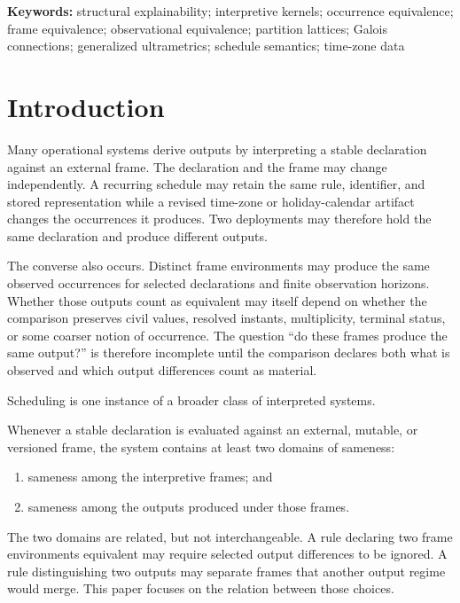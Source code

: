 \documentclass[11pt]{article}
\theoremstyle{plain}
\theoremstyle{definition}
\theoremstyle{remark}
\providecommand{\keywords}[1]{\vspace{0.5em}\noindent\textbf{Keywords: }\small #1}
\begin{document}
\keywords{
  structural explainability;
  interpretive kernels;
  occurrence equivalence;
  frame equivalence;
  observational equivalence;
  partition lattices;
  Galois connections;
  generalized ultrametrics;
  schedule semantics;
  time-zone data
}

\section{Introduction}
\label{ik.sec.intro}

Many operational systems derive outputs
by interpreting a stable declaration against an external frame.
The declaration and the frame may change independently.
A recurring schedule may retain the same rule,
identifier,
and stored representation
while a revised time-zone
or holiday-calendar artifact
changes the occurrences it produces.
Two deployments may therefore hold the same declaration
and produce different outputs.

The converse also occurs.
Distinct frame environments
may produce the same observed occurrences
for selected declarations
and finite observation horizons.
Whether those outputs count as equivalent
may itself depend on whether the comparison preserves
civil values,
resolved instants,
multiplicity,
terminal status,
or some coarser notion of occurrence.
The question
``do these frames produce the same output?''
is therefore incomplete
until the comparison declares
both what is observed
and which output differences count as material.

Scheduling is one instance
of a broader class of interpreted systems.

Whenever a stable declaration
is evaluated against an external,
mutable,
or versioned frame,
the system contains at least two domains of sameness:

\begin{enumerate}
  \item sameness among the interpretive frames; and
  \item sameness among the outputs produced under those frames.
\end{enumerate}

The two domains are related, but not interchangeable.
A rule declaring two frame environments equivalent
may require selected output differences to be ignored.
A rule distinguishing two outputs may separate frames
that another output regime would merge.
This paper focuses on the relation between those choices.
\end{document}
